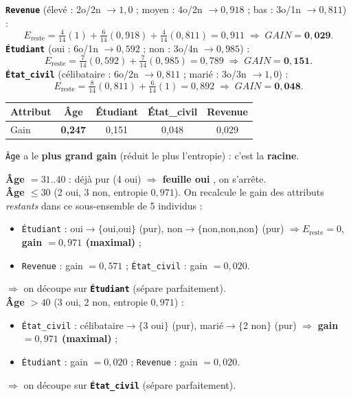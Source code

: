 \begin{Calcul}
\textbf{\texttt{Revenue}} (élevé : 2o/2n $\to1{,}0$ ; moyen : 4o/2n $\to0{,}918$ ; bas : 3o/1n $\to0{,}811$) :
\[ E_{\text{reste}}=\tfrac{4}{14}(1)+\tfrac{6}{14}(0{,}918)+\tfrac{4}{14}(0{,}811)=0{,}911
   \;\Rightarrow\; GAIN=\mathbf{0{,}029}. \]
\textbf{\texttt{Étudiant}} (oui : 6o/1n $\to0{,}592$ ; non : 3o/4n $\to0{,}985$) :
\[ E_{\text{reste}}=\tfrac{7}{14}(0{,}592)+\tfrac{7}{14}(0{,}985)=0{,}789
   \;\Rightarrow\; GAIN=\mathbf{0{,}151}. \]
\textbf{\texttt{État\_civil}} (célibataire : 6o/2n $\to0{,}811$ ; marié : 3o/3n $\to1{,}0$) :
\[ E_{\text{reste}}=\tfrac{8}{14}(0{,}811)+\tfrac{6}{14}(1)=0{,}892
   \;\Rightarrow\; GAIN=\mathbf{0{,}048}. \]
\end{Calcul}

\begin{Astuce}
\begin{center}\small
\begin{tabular}{lcccc}
\toprule
Attribut & \textbf{Âge} & Étudiant & État\_civil & Revenue\\
\midrule
Gain & \cellcolor{vertclair}\textbf{0,247} & 0,151 & 0,048 & 0,029\\
\bottomrule
\end{tabular}
\end{center}
\texttt{Âge} a le \textbf{plus grand gain} (réduit le plus l'entropie) : c'est la \textbf{racine}.
\end{Astuce}

\begin{Calcul}
\textbf{Âge $=31..40$} : déjà pur (4 oui) $\Rightarrow$ \textbf{feuille \og oui \fg{}}, on s'arrête.\\[3pt]
\textbf{Âge $\le 30$} (2 oui, 3 non, entropie $0{,}971$). On recalcule le gain des attributs
\emph{restants} dans ce sous-ensemble de 5 individus :
\begin{itemize}[nosep,leftmargin=1.4em]
  \item \texttt{Étudiant} : oui$\to\{$oui,oui$\}$ (pur), non$\to\{$non,non,non$\}$ (pur)
        $\Rightarrow E_{\text{reste}}=0$, \textbf{gain $=0{,}971$ (maximal)} ;
  \item \texttt{Revenue} : gain $=0{,}571$ ; \quad \texttt{État\_civil} : gain $=0{,}020$.
\end{itemize}
$\Rightarrow$ on découpe sur \textbf{\texttt{Étudiant}} (sépare parfaitement).\\[3pt]
\textbf{Âge $>40$} (3 oui, 2 non, entropie $0{,}971$) :
\begin{itemize}[nosep,leftmargin=1.4em]
  \item \texttt{État\_civil} : célibataire$\to\{$3 oui$\}$ (pur), marié$\to\{$2 non$\}$ (pur)
        $\Rightarrow$ \textbf{gain $=0{,}971$ (maximal)} ;
  \item \texttt{Étudiant} : gain $=0{,}020$ ; \quad \texttt{Revenue} : gain $=0{,}020$.
\end{itemize}
$\Rightarrow$ on découpe sur \textbf{\texttt{État\_civil}} (sépare parfaitement).
\end{Calcul}

